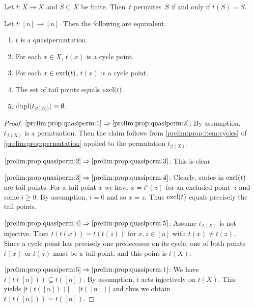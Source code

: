\begin{corollary}
    Let $t \colon X \to X$ and $S \subseteq X$ be finite.
    Then~$t$ permutes~$S$ if and only if $t(S) = S$.		
\end{corollary}

\begin{proposition} \label{prelim:prop:quasiperm}
	Let $t \colon [n] \to [n]$. Then the following are equivalent.
	\begin{enumerate}
		\item \label{prelim:prop:quasiperm:1} $t$ is a quasipermutation.	
		
		\item \label{prelim:prop:quasiperm:2} For each $x \in X$, $t(x)$ is a cycle point.
		
		\item \label{prelim:prop:quasiperm:3} For each $x \in \operatorname{excl}(t)$, $t(x)$ is a cycle point.	
		
		\item \label{prelim:prop:quasiperm:4} The set of tail points equals $\operatorname{excl}(t)$.
		
		\item \label{prelim:prop:quasiperm:5} $\operatorname{dupl}(t_{|t([n])}) = \emptyset$.
		
	\end{enumerate}	
\end{proposition}
\begin{proof}
	$\ref{prelim:prop:quasiperm:1}\Rightarrow \ref{prelim:prop:quasiperm:2}$:
	By assumption, $t_{|t(X)}$ is a permtuation.
	Then the claim follows from \cref{prelim:prop:item:cycles} of \cref{prelim:prop:permutation}
	applied to the permutation $t_{|t(X)}$.
		
	$\ref{prelim:prop:quasiperm:2}\Rightarrow \ref{prelim:prop:quasiperm:3}$:	This is clear.
		
	$\ref{prelim:prop:quasiperm:3}\Rightarrow \ref{prelim:prop:quasiperm:4}$:	
	Clearly, states in $\operatorname{excl}(t)$ are tail points.
	For a tail point $x$ we have $x = t^i(z)$
	for an excluded point~$z$ and some $i \ge 0$.
	By assumption, $i = 0$ and so $x = z$.
	Thus $\operatorname{excl}(t)$ equals precisely the tail points.	
	
	$\ref{prelim:prop:quasiperm:4}\Rightarrow \ref{prelim:prop:quasiperm:5}$:
	Assume $t_{|t(X)}$ is not injective.
	Then $t(t(x)) = t(t(z))$ for $x,z \in [n]$
	with $t(x) \ne t(z)$.
	Since a cycle point has precisely one predecessor on its cycle,
	one of both points $t(x)$ or $t(z)$ must be a tail point,
	and this point is $t(X)$.
	
	$\ref{prelim:prop:quasiperm:5}\Rightarrow \ref{prelim:prop:quasiperm:1}$:
	We have $t(t([n])) \subseteq t([n])$.
	By assumption, $t$ acts injectively on $t(X)$.
	This yields $|t(t([n]))| = |t([n])|$ and thus we 
	obtain $t(t([n])) = t([n])$.
\end{proof}

